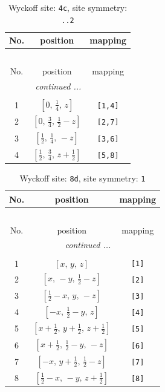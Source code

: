 \documentclass[fleqn,8pt]{jsarticle}
\begin{document}
\renewcommand{\arraystretch}{1.2}
\begin{longtable}{ccc}
\caption{Wyckoff site: {\tt 4c}, site symmetry: {\tt ..2}}
 \\
 \hline \hline
No. & position & mapping \\ \hline \endfirsthead

\multicolumn{2}{l}{\tablename\ \thetable{}} \\
 \hline \hline
No. & position & mapping \\ \hline \endhead

 \hline \hline
\multicolumn{2}{r}{\footnotesize\it continued ...} \\ \endfoot

 \hline \hline
\multicolumn{2}{r}{} \\ \endlastfoot

1 & $\left[ 0,\, \frac{1}{4},\, z \right]$ & {\tt [1,4]} \\ \hline
2 & $\left[ 0,\, \frac{3}{4},\, \frac{1}{2} - z \right]$ & {\tt [2,7]} \\ \hline
3 & $\left[ \frac{1}{2},\, \frac{1}{4},\, - z \right]$ & {\tt [3,6]} \\ \hline
4 & $\left[ \frac{1}{2},\, \frac{3}{4},\, z + \frac{1}{2} \right]$ & {\tt [5,8]} \\
\end{longtable}
\renewcommand{\arraystretch}{1.2}
\begin{longtable}{ccc}
\caption{Wyckoff site: {\tt 8d}, site symmetry: {\tt 1}}
 \\
 \hline \hline
No. & position & mapping \\ \hline \endfirsthead

\multicolumn{2}{l}{\tablename\ \thetable{}} \\
 \hline \hline
No. & position & mapping \\ \hline \endhead

 \hline \hline
\multicolumn{2}{r}{\footnotesize\it continued ...} \\ \endfoot

 \hline \hline
\multicolumn{2}{r}{} \\ \endlastfoot

1 & $\left[ x,\, y,\, z \right]$ & {\tt [1]} \\ \hline
2 & $\left[ x,\, - y,\, \frac{1}{2} - z \right]$ & {\tt [2]} \\ \hline
3 & $\left[ \frac{1}{2} - x,\, y,\, - z \right]$ & {\tt [3]} \\ \hline
4 & $\left[ - x,\, \frac{1}{2} - y,\, z \right]$ & {\tt [4]} \\ \hline
5 & $\left[ x + \frac{1}{2},\, y + \frac{1}{2},\, z + \frac{1}{2} \right]$ & {\tt [5]} \\ \hline
6 & $\left[ x + \frac{1}{2},\, \frac{1}{2} - y,\, - z \right]$ & {\tt [6]} \\ \hline
7 & $\left[ - x,\, y + \frac{1}{2},\, \frac{1}{2} - z \right]$ & {\tt [7]} \\ \hline
8 & $\left[ \frac{1}{2} - x,\, - y,\, z + \frac{1}{2} \right]$ & {\tt [8]} \\
\end{longtable}
\end{document}
